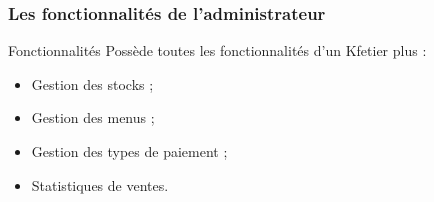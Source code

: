 \documentclass{polytech-presentation}
\begin{document}
                \begin{frame}
                 \frametitle{Les fonctionnalités de l'administrateur}
                 \begin{block}{Fonctionnalités}
                  Possède toutes les fonctionnalités d'un Kfetier plus :
                  \begin{itemize}
                   \item Gestion des stocks ;
		   \item Gestion des menus ;
		   \item Gestion des types de paiement ;
		   \item Statistiques de ventes.
                  \end{itemize}
                 \end{block}
                \end{frame}

\end{document}
